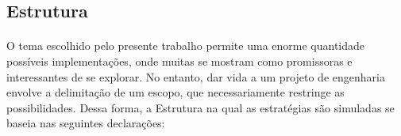 \FloatBarrier
\subsection{Estrutura}
\label{sub:estrutura}

\paragraph{} O tema escolhido pelo presente trabalho permite uma enorme quantidade possíveis implementações, onde muitas se mostram como promissoras e interessantes de se explorar. No entanto, dar vida a um projeto de engenharia envolve a delimitação de um escopo, que necessariamente restringe as possibilidades. Dessa forma, a Estrutura na qual as estratégias são simuladas se baseia nas seguintes declarações:


